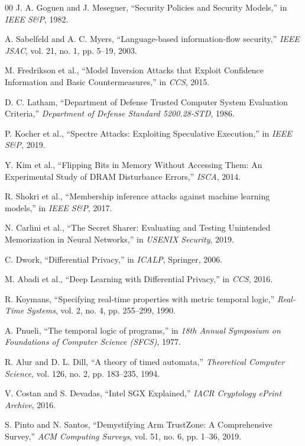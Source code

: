 \documentclass[conference]{IEEEtran}
\begin{document}
\begin{thebibliography}{00}
 J. A. Goguen and J. Meseguer, ``Security Policies and Security Models,'' in \textit{IEEE S\&P}, 1982.

 A. Sabelfeld and A. C. Myers, ``Language-based information-flow security,'' \textit{IEEE JSAC}, vol. 21, no. 1, pp. 5--19, 2003.

 M. Fredrikson et al., ``Model Inversion Attacks that Exploit Confidence Information and Basic Countermeasures,'' in \textit{CCS}, 2015.

 D. C. Latham, ``Department of Defense Trusted Computer System Evaluation Criteria,'' \textit{Department of Defense Standard 5200.28-STD}, 1986.

 P. Kocher et al., ``Spectre Attacks: Exploiting Speculative Execution,'' in \textit{IEEE S\&P}, 2019.

 Y. Kim et al., ``Flipping Bits in Memory Without Accessing Them: An Experimental Study of DRAM Disturbance Errors,'' \textit{ISCA}, 2014.

 R. Shokri et al., ``Membership inference attacks against machine learning models,'' in \textit{IEEE S\&P}, 2017.

 N. Carlini et al., ``The Secret Sharer: Evaluating and Testing Unintended Memorization in Neural Networks,'' in \textit{USENIX Security}, 2019.

 C. Dwork, ``Differential Privacy,'' in \textit{ICALP}, Springer, 2006.

 M. Abadi et al., ``Deep Learning with Differential Privacy,'' in \textit{CCS}, 2016.

 R. Koymans, ``Specifying real-time properties with metric temporal logic,'' \textit{Real-Time Systems}, vol. 2, no. 4, pp. 255--299, 1990.

 A. Pnueli, ``The temporal logic of programs,'' in \textit{18th Annual Symposium on Foundations of Computer Science (SFCS)}, 1977.

 R. Alur and D. L. Dill, ``A theory of timed automata,'' \textit{Theoretical Computer Science}, vol. 126, no. 2, pp. 183--235, 1994.

 V. Costan and S. Devadas, ``Intel SGX Explained,'' \textit{IACR Cryptology ePrint Archive}, 2016.

 S. Pinto and N. Santos, ``Demystifying Arm TrustZone: A Comprehensive Survey,'' \textit{ACM Computing Surveys}, vol. 51, no. 6, pp. 1--36, 2019.

\end{thebibliography}
\end{document}
